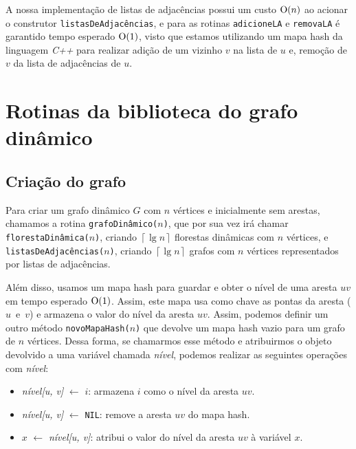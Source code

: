 A nossa implementação \cite{chung2025} de listas de adjacências possui um custo $\mathrm{O}(n)$ ao acionar o construtor \texttt{listasDeAdjacências}, e para 
as rotinas \texttt{adicioneLA} e \texttt{removaLA} é garantido tempo esperado $\mathrm{O}(1)$, visto que estamos utilizando um mapa hash da linguagem \textit{C++} para realizar adição de um vizinho $v$ na lista de $u$ e, remoção de $v$ da lista de adjacências de $u$.

\section{Rotinas da biblioteca do grafo dinâmico}
\label{sec:dynamic-graph-routines}

\subsection{Criação do grafo}
\label{sec:dynamic-graph-creation}

Para criar um grafo dinâmico $G$ com $n$ vértices e inicialmente sem arestas, chamamos a rotina \texttt{grafoDinâmico($n$)}, que por sua vez irá chamar \texttt{florestaDinâmica($n$)}, criando $\left\lceil \lg n \right\rceil$ florestas dinâmicas com $n$ vértices, e \texttt{listasDeAdjacências($n$)}, criando $\left\lceil \lg n \right\rceil$ grafos com $n$ vértices representados por listas de adjacências. 

Além disso, usamos um mapa hash para guardar e obter o nível de uma aresta $uv$ em tempo esperado $\mathrm{O}(1)$. Assim, este mapa usa como chave as pontas da aresta ($u$~e~$v$) e armazena o valor do nível da aresta $uv$. Assim, podemos definir um outro método \texttt{novoMapaHash($n$)} que devolve um mapa hash vazio para um grafo de $n$ vértices. Dessa forma, se chamarmos esse método e atribuirmos o objeto devolvido a uma variável chamada \textit{nível}, podemos realizar as seguintes operações com \textit{nível}:

\begin{itemize}
    \item \textit{nível[u, v]} $\leftarrow$ $i$: armazena $i$ como o nível da aresta $uv$.
    
    \item \textit{nível[u, v]} $\leftarrow$ \texttt{NIL}: remove a aresta $uv$ do mapa hash.
    
    \item $x$ $\leftarrow$ \textit{nível[u, v]}: atribui o valor do nível da aresta $uv$ à variável $x$. 
\end{itemize}

